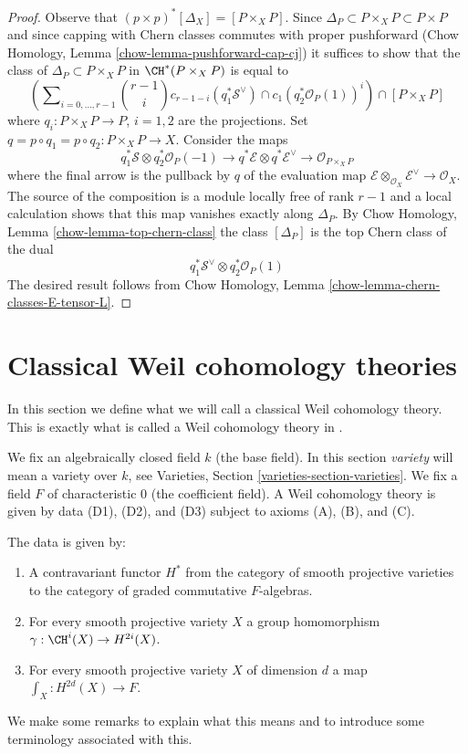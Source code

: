 \begin{proof}
Observe that $(p \times p)^*[\Delta_X] = [P \times_X P]$.
Since $\Delta_P \subset P \times_X P \subset P \times P$
and since capping with Chern classes commutes with proper pushforward
(Chow Homology, Lemma \ref{chow-lemma-pushforward-cap-cj})
it suffices to show that the class of
$\Delta_P \subset P \times_X P$ in $\CH^*(P \times_X P)$
is equal to
$$
\left(\sum\nolimits_{i = 0, \ldots, r - 1}
{r - 1 \choose i} c_{r - 1 - i}(q_1^*\mathcal{S}^\vee) \cap
c_1(q_2^*\mathcal{O}_P(1))^i\right)
\cap
[P \times_X P]
$$
where $q_i : P \times_X P \to P$, $i = 1, 2$ are the projections.
Set $q = p \circ q_1 = p \circ q_2 : P \times_X P \to X$.
Consider the maps
$$
q_1^*\mathcal{S} \otimes q_2^*\mathcal{O}_P(-1) \to
q^*\mathcal{E} \otimes q^*\mathcal{E}^\vee \to
\mathcal{O}_{P \times_X P}
$$
where the final arrow is the pullback by $q$ of the evaluation map
$\mathcal{E} \otimes_{\mathcal{O}_X} \mathcal{E}^\vee \to \mathcal{O}_X$.
The source of the composition is a module locally free of rank $r - 1$
and a local calculation shows that this map vanishes exactly along
$\Delta_P$. By Chow Homology, Lemma \ref{chow-lemma-top-chern-class}
the class $[\Delta_P]$ is the top Chern class of the dual
$$
q_1^*\mathcal{S}^\vee \otimes q_2^*\mathcal{O}_P(1)
$$
The desired result follows from Chow Homology, Lemma
\ref{chow-lemma-chern-classes-E-tensor-L}.
\end{proof}

\section{Classical Weil cohomology theories}
\label{weil-section-axioms-classical}
In this section we define what we will call a classical Weil cohomology
theory. This is exactly what is called a Weil cohomology theory in
\cite[Section 1.2]{Kleiman-cycles}.

\medskip\noindent
We fix an algebraically closed field $k$ (the base field).
In this section {\it variety} will mean a variety over $k$, see
Varieties, Section \ref{varieties-section-varieties}.
We fix a field $F$ of characteristic $0$ (the coefficient field).
A Weil cohomology theory is given by data (D1), (D2), and (D3)
subject to axioms (A), (B), and (C).

\medskip\noindent
The data is given by:
\begin{enumerate}
\item[(D1)] A contravariant functor $H^*$ from the category
of smooth projective varieties to the category of
graded commutative $F$-algebras.
\item[(D2)] For every smooth projective variety $X$
a group homomorphism $\gamma : \CH^i(X) \to H^{2i}(X)$.
\item[(D3)] For every smooth projective variety $X$ of dimension $d$
a map $\int_X : H^{2d}(X) \to F$.
\end{enumerate}
We make some remarks to explain what this means and to introduce
some terminology associated with this.

